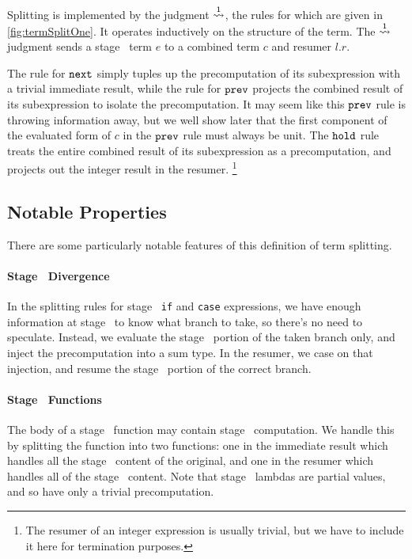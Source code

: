 Splitting is implemented by the judgment $\overset{ 1}\rightsquigarrow$,
the rules for which are given in \cref{fig:termSplitOne}.  
It operates inductively on the structure of the term.  
The $\overset{ 1}\rightsquigarrow$ judgment sends a stage \bbone\ term $e$ to a combined term
$c$ and resumer $l.r$. 

The rule for ${\tt next}$ simply tuples up the precomputation of its subexpression with a trivial immediate result,
while the rule for ${\tt prev}$ projects the combined result of its subexpression to isolate the precomputation.
It may seem like this ${\tt prev}$ rule is throwing information away, but we well show later that the first component 
of the evaluated form of $c$ in the ${\tt prev}$ rule must always be unit.
The ${\tt hold}$ rule treats the entire combined result of its subexpression as a precomputation, 
and projects out the integer result in the resumer.%
\footnote{The resumer of an integer expression is usually trivial, 
but we have to include it here for termination purposes.}

\subsection {Notable Properties}


There are some particularly notable features of this definition of term
splitting.


\paragraph {Stage \bbone\ Divergence}

In the splitting rules for stage \bbone\ {\tt if} and {\tt case} expressions, we
have enough information at stage \bbone\ to know what branch to take, so there's
no need to speculate. Instead, we evaluate the stage \bbone\ portion of the
taken branch only, and inject the precomputation into a sum type. In the
resumer, we case on that injection, and resume the stage \bbtwo\ portion of the
correct branch.

\paragraph {Stage \bbone\ Functions}

The body of a stage \bbone\ function may contain stage \bbtwo\ computation. We
handle this by splitting the function into two functions: one in the immediate
result which handles all the stage \bbone\ content of the original, and one in
the resumer which handles all of the stage \bbtwo\ content. Note that stage
\bbone\ lambdas are partial values, and so have only a trivial precomputation.

